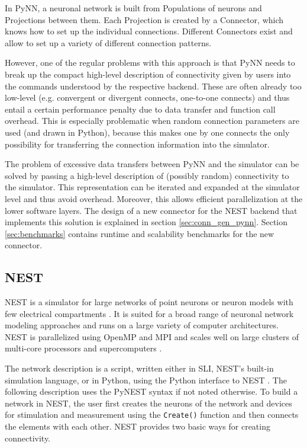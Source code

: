 \documentclass{frontiersSCNS} %
\begin{document}
In PyNN, a neuronal network is built from Populations of neurons and
Projections between them. Each Projection is created by a Connector,
which knows how to set up the individual connections. Different
Connectors exist and allow to set up a variety of different connection
patterns.

However, one of the regular problems with this approach is that PyNN
needs to break up the compact high-level description of connectivity
given by users into the commands understood by the respective
backend. These are often already too low-level (e.g. convergent or
divergent connects, one-to-one connects) and thus entail a certain
performance penalty due to data transfer and function call
overhead. This is especially problematic when random connection
parameters are used (and drawn in Python), because this makes one by
one connects the only possibility for transferring the connection
information into the simulator.

The problem of excessive data transfers between PyNN and the simulator
can be solved by passing a high-level description of (possibly random)
connectivity to the simulator. This representation can be iterated and
expanded at the simulator level and thus avoid overhead. Moreover,
this allows efficient parallelization at the lower software layers.
The design of a new connector for the NEST backend that implements
this solution is explained in section \ref{sec:conn_gen_pynn}. Section
\ref{sec:benchmarks} contains runtime and scalability benchmarks for
the new connector.

\subsection{NEST}

NEST is a simulator for large networks of point neurons or neuron
models with few electrical compartments
\citep[\url{http://www.nest-initiative.org};][]{Gewaltig_07_11204}. It
is suited for a broad range of neuronal network modeling approaches
and runs on a large variety of computer architectures. NEST is
parallelized using OpenMP \citep{OpenMPSpec} and MPI
\citep{MPIForum94} and scales well on large clusters of multi-core
processors and supercomputers \citep{Helias12_26}.

The network description is a script, written either in SLI, NEST's
built-in simulation language, or in Python, using the Python interface
to NEST \citep[PyNEST;][]{Eppler09_12}. The following description uses
the PyNEST syntax if not noted otherwise. To build a network in NEST,
the user first creates the neurons of the network and devices for
stimulation and measurement using the \verb|Create()| function and
then connects the elements with each other. NEST provides two basic
ways for creating connectivity.
\end{document}
